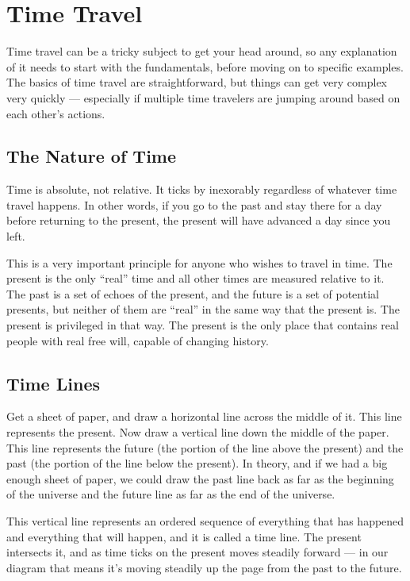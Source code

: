 \chapter[green]{Time Travel}
\label{chap:Time Travel}
\thispagestyle{plain}

\begin{multicols*}{2}
Time travel can be a tricky subject to get your head around, so any explanation of it needs to start with the fundamentals, before moving on to specific examples. The basics of time travel are straightforward, but things can get very complex very quickly — especially if multiple time travelers are jumping around based on each other’s actions.

\section{The Nature of Time}
Time is absolute, not relative. It ticks by inexorably regardless of whatever time travel happens. In other words, if you go to the past and stay there for a day before returning to the present, the present will have advanced a day since you left.

This is a very important principle for anyone who wishes to travel in time. The present is the only “real” time and all other times are measured relative to it. The past is a set of echoes of the present, and the future is a set of potential presents, but neither of them are “real” in the same way that the present is. The present is privileged in that way. The present is the only place that contains real people with real free will, capable of changing history.

\section{Time Lines}
Get a sheet of paper, and draw a horizontal line across the middle of it. This line represents the present. Now draw a vertical line down the middle of the paper. This line represents the future (the portion of the line above the present) and the past (the portion of the line below the present). In theory, and if we had a big enough sheet of paper, we could draw the past line back as far as the beginning of the universe and the future line as far as the end of the universe.

This vertical line represents an ordered sequence of everything that has happened and everything that will happen, and it is called a time line. The present intersects it, and as time ticks on the present moves steadily forward — in our diagram that means it’s moving steadily up the page from the past to the future.


\end{multicols*}
